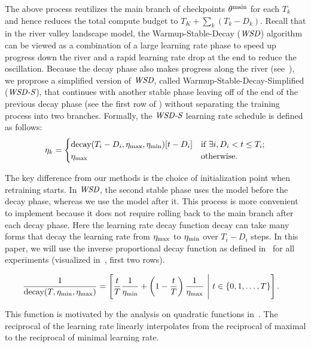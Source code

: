 The above process reutilizes the main branch of checkpoints ${\theta^{\mathrm{main}}}$ for each $T_k$ and hence reduces the total compute budget to $T_K + \sum_{k} (T_k - D_k)$. 
Recall that in the river valley landscape model, the Warmup-Stable-Decay ($\textit{WSD}$) algorithm can be viewed as a combination of a large learning rate phase to speed up progress down the river and a rapid learning rate drop at the end to reduce the oscillation. Because the decay phase also makes progress along the river (see~), we proprose a simplified version of $\textit{WSD}$, called Warmup-Stable-Decay-Simplified (\textbf{$\textit{WSD-S}$}), that continues with another stable phase leaving off of the end of the previous decay phase (see the first row of ) without separating the training process into two branches. Formally, the $\textit{WSD-S}$ learning rate schedule is defined as follows:
\begin{align}
\label{eq:lrs}
\eta_k = \begin{cases} 
\text{decay}(T_{i} - D_i, \eta_{\mathrm{max}}, \eta_{\mathrm{min}})[t - D_i] & \text{if } \exists i, D_i < t \leq T_i; \\
\eta_{\mathrm{max}} & \text{otherwise.} \\
\end{cases}
\end{align}

The key difference from our methods is the choice of initialization point when retraining starts. In $\textit{WSD}$, the second stable phase uses the model before the decay phase, whereas we use the model after it.
This process is more convenient to implement because it does not require rolling back to the main branch after each decay phase. Here the learning rate decay function $\mathrm{decay}$ can take many forms that decay the learning rate from $\eta_{\mathrm{max}}$ to $\eta_{\mathrm{min}}$ over $T_i - D_i$ steps. In this paper, we will use the inverse proportional decay function as defined in~ for all experiments (visualized in~, first two rows).

\begin{align}
\label{eq:decay}
\frac{1}{\text{decay}(T, \mineta, \maxeta)} &= \left[ \frac{t}{T} \frac{1}{\mineta} + \left(1 - \frac{t}{T}\right) \frac{1}{\maxeta} \ \Bigg| \ t \in \{0, 1, \ldots, T\} \right]. 
\end{align}

This function is motivated by the analysis on quadratic functions in~. The reciprocal
 of the learning rate linearly interpolates from the reciprocal
 of maximal to the reciprocal
 of minimal learning rate.
